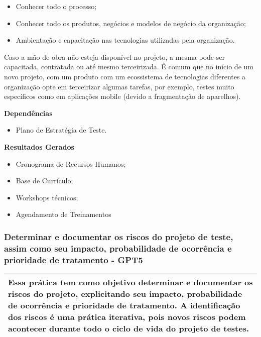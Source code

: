 \begin{itemize}
\item Conhecer todo o processo;
\item Conhecer todo os produtos, negócios e modelos de negócio da organização;
\item Ambientação e capacitação nas tecnologias utilizadas pela organização.
\end{itemize}

Caso a mão de obra não esteja disponível no projeto, a mesma pode ser capacitada, contratada ou até mesmo terceirizada. É comum que no início de um novo projeto, com um produto com um ecossistema de tecnologias diferentes a organização opte em terceirizar algumas tarefas, por exemplo, testes muito específicos como em aplicações mobile (devido a fragmentação de aparelhos).

\textbf{Dependências}
\begin{itemize}
\item Plano de Estratégia de Teste.
\end{itemize}

\textbf{Resultados Gerados}
\begin{itemize}
\item Cronograma de Recursos Humanos;
\item Base de Currículo;
\item Workshops técnicos;
\item Agendamento de Treinamentos
\end{itemize}

\subsubsection{Determinar e documentar os riscos do projeto de teste, assim como seu impacto, probabilidade de ocorrência e prioridade de tratamento - GPT5}
\label{sec:gpt5}

\begin{table}[!ht]
\centering
\begin{tabular}{|p{130mm}|}
\hline
Essa prática tem como objetivo determinar e documentar os riscos do projeto, explicitando seu impacto, probabilidade de ocorrência e prioridade de tratamento. A identificação dos riscos é uma prática iterativa, pois novos riscos podem acontecer durante todo o ciclo de vida do projeto de testes. \\ 
\hline
\end{tabular}
\end{table}

